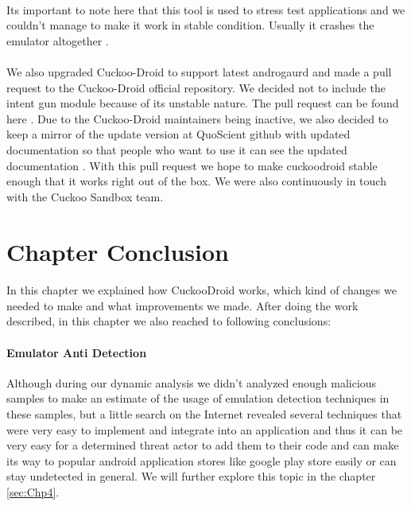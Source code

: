\documentclass[../main.tex]{subfile}
\begin{document}
		\paragraph{} Its important to note here that this tool is used to stress test applications and we couldn't manage to make it work in stable condition. Usually it crashes the emulator altogether \cite{issue52}.
		
		\paragraph{} We also upgraded Cuckoo-Droid to support latest androgaurd and made a pull request to the Cuckoo-Droid official repository\cite{cuckoodroid_github}. We decided not to include the intent gun module because of its unstable nature. The pull request can be found here \cite{cuckoodroid_pullreq}. Due to the Cuckoo-Droid maintainers being inactive, we also decided to keep a mirror of the update version at QuoScient github with updated documentation so that people who want to use it can see the updated documentation \cite{cuckoodroid_quoscient}. With this pull request we hope to make cuckoodroid stable enough that it works right out of the box. We were also continuously in touch with the Cuckoo Sandbox team.
		
		\section{Chapter Conclusion}
		\paragraph{} In this chapter we explained how CuckooDroid works, which kind of changes we needed to make and what improvements we made. After doing the work described, in this chapter we also reached to following conclusions:
		\paragraph{Emulator Anti Detection} Although during our dynamic analysis we didn't analyzed enough malicious samples to make an estimate of the usage of emulation detection techniques in these samples, but a little search on the Internet revealed several techniques that were very easy to implement and integrate into an application and thus it can be very easy for a determined threat actor to add them to their code and can make its way to popular android application stores like google play store easily or can stay undetected in general. We will further explore this topic in the chapter \ref{sec:Chp4}.
		
\end{document}
